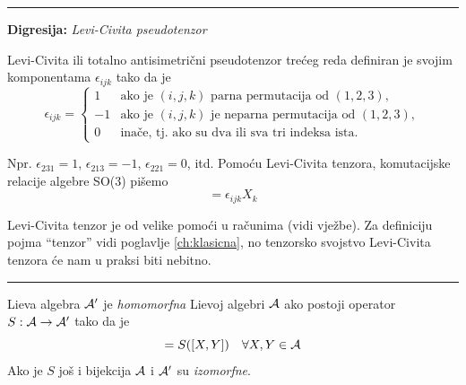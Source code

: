 \rule{3cm}{0.5pt}

\textbf{Digresija:} \emph{Levi-Civita pseudotenzor}

Levi-Civita ili totalno antisimetrični pseudotenzor trećeg reda definiran
je svojim komponentama $\epsilon_{ijk}$ tako da je
\begin{displaymath}
\epsilon_{ijk}=
\begin{cases}
1& \text{ako je $(i,j,k)$ parna permutacija od $(1,2,3)$}, \\
-1& \text{ako je $(i,j,k)$ je neparna permutacija od $(1,2,3)$}, \\
0& \text{inače, tj. ako su dva ili sva tri indeksa ista}.
\end{cases} 
\end{displaymath}

Npr. $\epsilon_{231}=1$, $\epsilon_{213}=-1$, $\epsilon_{221}=0$, itd.
Pomoću Levi-Civita tenzora, komutacijske relacije algebre SO(3) pišemo
\begin{displaymath}
 [X_i, X_j]=\epsilon_{ijk} X_k  
\end{displaymath}

Levi-Civita tenzor je od velike pomoći u računima (vidi vježbe).
Za definiciju pojma ``tenzor'' vidi poglavlje \ref{ch:klasicna}, no tenzorsko
svojstvo Levi-Civita tenzora će nam u praksi biti nebitno.

\rule{3cm}{0.5pt}

Lieva algebra $\mathcal{A}'$ je \emph{homomorfna} Lievoj algebri $\mathcal{A}$ ako postoji 
operator $S:\mathcal{A}\to\mathcal{A}'$ tako da je
\begin{displaymath}
       [S(X), S(Y)]=S([X,Y]) \quad \forall X, Y \in\calA
\end{displaymath}
Ako je $S$ još i bijekcija $\mathcal{A}$ i $\mathcal{A}'$ su \emph{izomorfne}.

